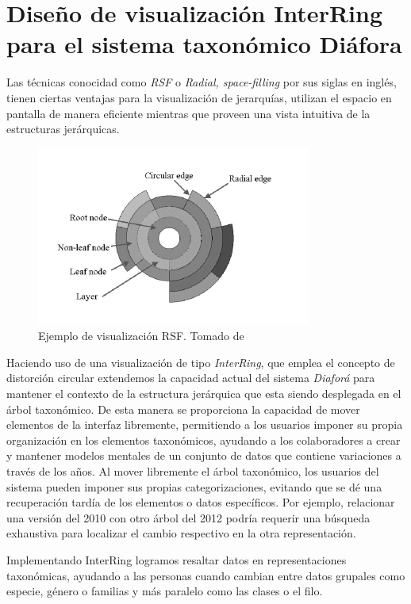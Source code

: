 \documentclass[journal]{IEEEtran}
\begin{document}
\section{Diseño de visualización InterRing para el sistema taxonómico Diáfora}
Las técnicas conocidad como \emph{RSF} o \emph{Radial, space-filling} por sus siglas en inglés,
 tienen ciertas ventajas
para la visualización de jerarquías, utilizan el espacio en pantalla de manera eficiente mientras que proveen una vista intuitiva 
de la estructuras jerárquicas.
\begin{figure}[]
  \centering
  \includegraphics[scale=0.6]{interring}
  \caption{Ejemplo de visualización RSF. Tomado  de \cite{yang_ward_rundensteiner}}
\end{figure}

Haciendo uso de una visualización de tipo \emph{InterRing}\cite{yang_ward_rundensteiner}, que emplea
el concepto de distorción circular extendemos la capacidad actual del sistema \emph{Diaforá} para mantener el contexto
de la estructura jerárquica que esta siendo desplegada en el árbol taxonómico. De esta manera se proporciona la capacidad de mover elementos de la interfaz libremente, permitiendo a los usuarios imponer su propia organización en los elementos taxonómicos, ayudando a los colaboradores a crear y mantener modelos mentales de un conjunto de datos que contiene variaciones a través de los años. 
Al mover libremente el árbol taxonómico, los usuarios del sistema pueden imponer sus propias categorizaciones, evitando que se dé una recuperación tardía de los elementos o datos específicos. Por ejemplo, relacionar una versión del 2010 con otro árbol del 2012 podría requerir una búsqueda exhaustiva para localizar el cambio respectivo en la otra representación. 

Implementando InterRing logramos resaltar datos en representaciones taxonómicas, ayudando a las personas cuando cambian entre datos grupales como especie, género o familias y más paralelo como las clases o el filo. 
\end{document}
